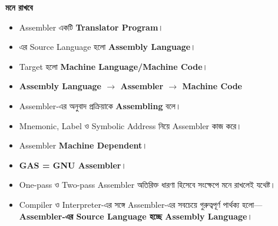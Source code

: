\begin{rememberbox}

\textbf{\color{deepOrange}মনে রাখবে}

\begin{itemize}

\item Assembler একটি \textbf{Translator Program}।

\item এর Source Language হলো \textbf{Assembly Language}।

\item Target হলো \textbf{Machine Language/Machine Code}।

\item
\textbf{
Assembly Language
\(\rightarrow\)
Assembler
\(\rightarrow\)
Machine Code
}

\item Assembler-এর অনুবাদ প্রক্রিয়াকে
\textbf{Assembling} বলে।

\item Mnemonic, Label ও Symbolic Address নিয়ে Assembler কাজ করে।

\item Assembler \textbf{Machine Dependent}।

\item \textbf{GAS = GNU Assembler}।

\item One-pass ও Two-pass Assembler অতিরিক্ত ধারণা হিসেবে
সংক্ষেপে মনে রাখলেই যথেষ্ট।

\item Compiler ও Interpreter-এর সঙ্গে Assembler-এর সবচেয়ে
গুরুত্বপূর্ণ পার্থক্য হলো—
\textbf{Assembler-এর Source Language হচ্ছে Assembly Language}।

\end{itemize}

\end{rememberbox}

\small


